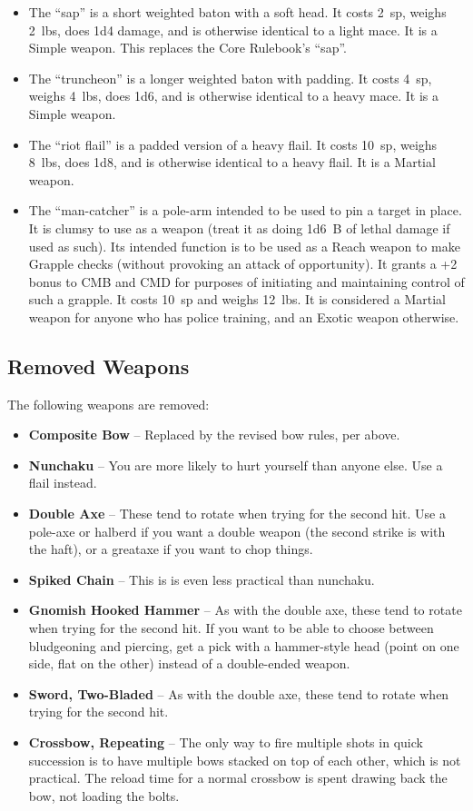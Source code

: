 \begin{itemize}
%
\item The ``sap'' is a short weighted baton with a soft head. It costs 2~sp,
weighs 2~lbs, does 1d4 damage, and is otherwise identical to a light mace.
It is a Simple weapon. This replaces the Core Rulebook's ``sap''.
%
\item The ``truncheon'' is a longer weighted baton with padding. It costs
4~sp, weighs 4~lbs, does 1d6, and is otherwise identical to a heavy mace.
It is a Simple weapon.
%
\item The ``riot flail'' is a padded version of a heavy flail. It costs
10~sp, weighs 8~lbs, does 1d8, and is otherwise identical to a heavy flail.
It is a Martial weapon.
%
\item The ``man-catcher'' is a pole-arm intended to be used to pin a target
in place. It is clumsy to use as a weapon (treat it as doing 1d6~B of
lethal damage if used as such). Its intended function is to be used as a
Reach weapon to make Grapple checks (without provoking an attack of
opportunity). It grants a +2 bonus to CMB and CMD for purposes of initiating
and maintaining control of such a grapple. It costs 10~sp and weighs 12~lbs.
It is considered a Martial weapon for anyone who has police training, and an
Exotic weapon otherwise.
%
\end{itemize}
%

%
\subsection{Removed Weapons}

The following weapons are removed:
\begin{itemize}
\item \textbf{Composite Bow} -- Replaced by the revised bow rules, per above.
\item \textbf{Nunchaku} -- You are more likely to hurt yourself than anyone
else. Use a flail instead.
\item \textbf{Double Axe} -- These tend to rotate when trying for the second
hit. Use a pole-axe or halberd if you want a double weapon (the second
strike is with the haft), or a greataxe if you want to chop things.
\item \textbf{Spiked Chain} -- This is is even less practical than
nunchaku.
\item \textbf{Gnomish Hooked Hammer} -- As with the double axe, these tend
to rotate when trying for the second hit. If you want to be able to choose
between bludgeoning and piercing, get a pick with a hammer-style head
(point on one side, flat on the other) instead of a double-ended weapon.
\item \textbf{Sword, Two-Bladed} -- As with the double axe, these tend
to rotate when trying for the second hit.
\item \textbf{Crossbow, Repeating} -- The only way to fire multiple shots
in quick succession is to have multiple bows stacked on top of each other,
which is not practical. The reload time for a normal crossbow is spent
drawing back the bow, not loading the bolts.
\end{itemize}

